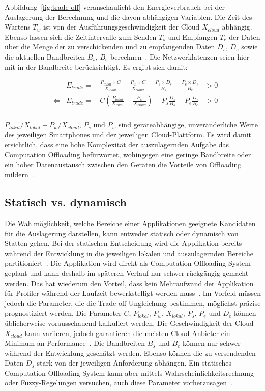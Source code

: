\documentclass{sigchi}
\begin{document}
Abbildung~\ref{fig:trade-off} veranschaulicht den Energieverbrauch bei der Auslagerung der Berechnung und die davon abhängigen Variablen. Die Zeit des Wartens $T_w$ ist von der Aus\-füh\-rungs\-ge\-schwin\-dig\-keit der Cloud $X_{\textit{cloud}}$ abhängig.
Ebenso lassen sich die Zeitintervalle zum Senden $T_s$ und Empfangen $T_e$ der Daten über die Menge der zu verschickenden und zu empfangenden Daten $D_s$, $D_e$ sowie die aktuellen Bandbreiten $B_s$, $B_e$ berechnen~\cite{o8}.
Die Netzwerklatenzen seien hier mit in der Bandbreite berücksichtigt.
Es ergibt sich damit:

\begin{align*}
	& & E_{\textit{trade}} = & \,\frac{P_{\textit{lokal}} \times C}{X_\textit{lokal}} - \frac{P_w \times C}{X_{\textit{cloud}}} - \frac{P_s \times D_s}{B_s} - \frac{P_e \times D_e}{B_e} & > 0 \\
	& \Leftrightarrow & E_{\textit{trade}} = & \, C\left( \frac{P_{\textit{lokal}}}{X_\textit{lokal}} - \frac{P_w}{X_{\textit{cloud}}} \right) - P_s\frac{D_s}{B_s} - P_e\frac{D_e}{B_e} & > 0 \\
\end{align*}

$P_{\textit{lokal}}/X_{\textit{lokal}} - P_{\textit{w}}/X_{\textit{cloud}}$, $P_s$ und $P_w$ sind geräteabhängige, unveränderliche Werte des jeweiligen Smartphones und der jeweiligen Cloud-Plattform.
Es wird damit ersichtlich, dass eine hohe Komplexität der auszulagernden Aufgabe das Computation Offloading befürwortet, wohingegen eine geringe Bandbreite oder ein hoher Datenaustausch zwischen den Geräten die Vorteile von Offloading mildern~\cite{o8}.

\subsection{Statisch vs. dynamisch}

Die Wahlmöglichkeit, welche Bereiche einer Applikationen geeignete Kandidaten für die Auslagerung darstellen, kann entweder statisch oder dynamisch von Statten gehen.
Bei der statischen Entscheidung wird die Applikation bereits während der Entwicklung in die jeweiligen lokalen und auszulagernden Bereiche partitioniert~\cite{o4}.
Die Applikation wird direkt als Computation Offloading System geplant und kann deshalb im späteren Verlauf nur schwer rückgängig gemacht werden.
Das hat wiederum den Vorteil, dass kein Mehraufwand der Applikation für Profiler während der Laufzeit bewerkstelligt werden muss~\cite{o4}.
Im Vorfeld müssen jedoch die Parameter, die die Trade-off-Ungleichung bestimmen, möglichst präzise prognostiziert werden.
Die Parameter $C$, $P_{\textit{lokal}}$, $P_w$, $X_{\textit{lokal}}$, $P_s$, $P_e$ und $D_e$ können üblicherweise vorausschauend kalkuliert werden.
 Die Geschwindigkeit der Cloud $X_{\textit{cloud}}$ kann variieren, jedoch garantieren die meisten Cloud-Anbieter ein Minimum an Performance~\cite{o4}.
 Die Bandbreiten $B_s$ und $B_e$ können nur schwer während der Entwicklung geschätzt werden.
 Ebenso können die zu versendenden Daten $D_s$ stark von der jeweiligen Anforderung abhängen.
 Ein statisches Computation Offloading System kann aber mittels Wahrscheinlichkeitsrechnung oder Fuzzy-Regelungen versuchen, auch diese Parameter vorherzusagen~\cite{o4}.
\end{document}
